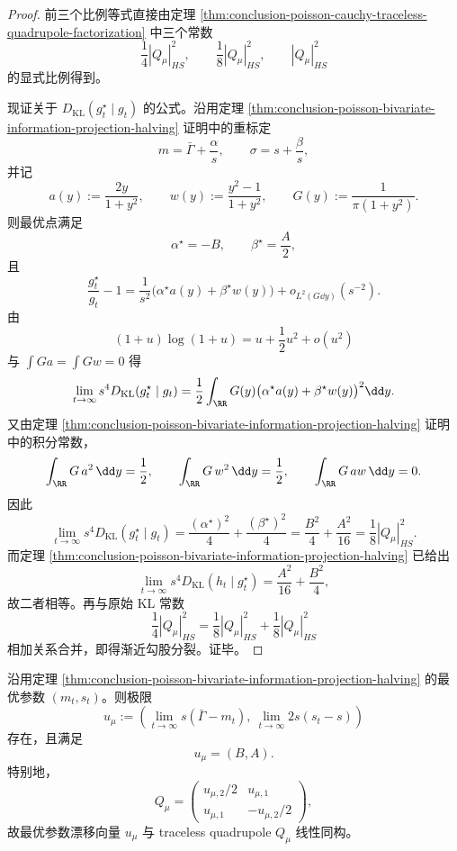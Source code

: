 \begin{proof}
前三个比例等式直接由定理 \ref{thm:conclusion-poisson-cauchy-traceless-quadrupole-factorization} 中三个常数
\[
\frac14|Q_\mu|_{HS}^2,\qquad
\frac18|Q_\mu|_{HS}^2,\qquad
|Q_\mu|_{HS}^2
\]
的显式比例得到。

现证关于 \(D_{\mathrm{KL}}(g_t^\star\mid g_t)\) 的公式。沿用定理 \ref{thm:conclusion-poisson-bivariate-information-projection-halving} 证明中的重标定
\[
m=\bar\Gamma+\frac{\alpha}{s},
\qquad
\sigma=s+\frac{\beta}{s},
\]
并记
\[
a(y):=\frac{2y}{1+y^2},
\qquad
w(y):=\frac{y^2-1}{1+y^2},
\qquad
G(y):=\frac{1}{\pi(1+y^2)}.
\]
则最优点满足
\[
\alpha^\star=-B,\qquad \beta^\star=\frac{A}{2},
\]
且
\[
\frac{g_t^\star}{g_t}-1
=
\frac{1}{s^2}\bigl(\alpha^\star a(y)+\beta^\star w(y)\bigr)+o_{L^2(G\dd y)}(s^{-2}).
\]
由
\[
(1+u)\log(1+u)=u+\frac12u^2+o(u^2)
\]
与 \(\int G a=\int Gw=0\) 得
\[
\lim_{t\to\infty}s^4D_{\mathrm{KL}}(g_t^\star\mid g_t)
=
\frac12\int_{\RR}G(y)\bigl(\alpha^\star a(y)+\beta^\star w(y)\bigr)^2\dd y.
\]
又由定理 \ref{thm:conclusion-poisson-bivariate-information-projection-halving} 证明中的积分常数，
\[
\int_{\RR}G\,a^2\,\dd y=\frac12,\qquad
\int_{\RR}G\,w^2\,\dd y=\frac12,\qquad
\int_{\RR}G\,aw\,\dd y=0.
\]
因此
\[
\lim_{t\to\infty}s^4D_{\mathrm{KL}}(g_t^\star\mid g_t)
=
\frac{(\alpha^\star)^2}{4}+\frac{(\beta^\star)^2}{4}
=
\frac{B^2}{4}+\frac{A^2}{16}
=
\frac18|Q_\mu|_{HS}^2.
\]
而定理 \ref{thm:conclusion-poisson-bivariate-information-projection-halving} 已给出
\[
\lim_{t\to\infty}s^4D_{\mathrm{KL}}(h_t\mid g_t^\star)=\frac{A^2}{16}+\frac{B^2}{4},
\]
故二者相等。再与原始 KL 常数
\[
\frac14|Q_\mu|_{HS}^2
=
\frac18|Q_\mu|_{HS}^2+\frac18|Q_\mu|_{HS}^2
\]
相加关系合并，即得渐近勾股分裂。证毕。
\end{proof}

\begin{theorem}\label{thm:conclusion-poisson-cauchy-optimal-drift-complete-inversion}
沿用定理 \ref{thm:conclusion-poisson-bivariate-information-projection-halving} 的最优参数 \((m_t,s_t)\)。则极限
\[
u_\mu:=
\left(
\lim_{t\to\infty}s(\bar\Gamma-m_t),\
\lim_{t\to\infty}2s(s_t-s)
\right)
\]
存在，且满足
\[
u_\mu=(B,A).
\]
特别地，
\[
Q_\mu=
\begin{pmatrix}
u_{\mu,2}/2 & u_{\mu,1}\\
u_{\mu,1} & -u_{\mu,2}/2
\end{pmatrix},
\]
故最优参数漂移向量 \(u_\mu\) 与 traceless quadrupole \(Q_\mu\) 线性同构。
\end{theorem}

